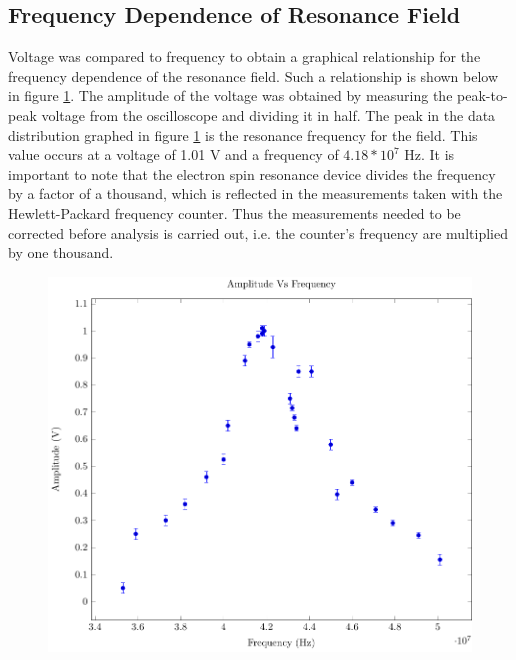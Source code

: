 \documentclass[a4paper]{article}
\begin{document}
\subsection{Frequency Dependence of Resonance Field}

\qq Voltage was compared to frequency to obtain a graphical
relationship for the frequency dependence of the resonance field. Such a relationship is shown below in figure \ref{FrequencyDependence}.
The amplitude of the voltage was obtained by measuring the peak-to-peak voltage from the oscilloscope and dividing it in half. The peak in the data distribution graphed in figure \ref{FrequencyDependence} is the resonance frequency for the
field. This value occurs at a voltage of 1.01 V and a frequency of
$4.18*10^7$ Hz. It is important to note that the electron spin
resonance device divides the frequency by a factor of a thousand, which is reflected in the measurements taken with the
 Hewlett-Packard frequency counter. Thus the measurements needed to be corrected before analysis is carried out, i.e. the
counter's frequency are multiplied by one thousand.

\begin{figure}[H]
\centering
\includegraphics[width=1\textwidth]{Plots/ExpFreqVsVolt/freq_depen.pdf}
\label{FrequencyDependence}
\end{figure}
\end{document}
